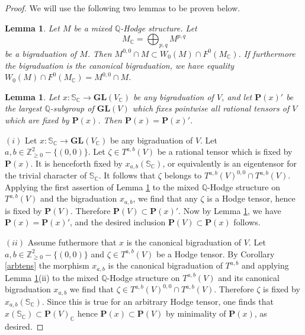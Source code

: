 \documentclass[10pt]{article}
\numberwithin{equation}{subsection}
\theoremstyle{plain}
\newtheorem{lemma}[theorem]{Lemma}
\theoremstyle{definition}
\theoremstyle{remark}
\newcommand{\Z}{\mathbb Z}
\newcommand{\Q}{\mathbb Q}
\newcommand{\C}{\mathbb C}
\newcommand{\s}{\mathbb S}
\newcommand{\pp}{\mathbf P}
\newcommand{\gl}{\mathbf{GL}}
\begin{document}
\begin{proof}
We will use the following two lemmas to be proven below.
\begin{lemma}\label{tenszero}
Let $M$ be a mixed $\Q$-Hodge structure. Let
\[
M_\C = \bigoplus_{p,q} M^{p,q}
\]
be a bigraduation of $M$. Then $M^{0,0} \cap M \subset W_0(M) \cap F^0(M_\C)$. If furthermore the bigraduation is the canonical bigraduation, we have equality $W_0(M) \cap F^0(M_\C) = M^{0,0} \cap M$.
\end{lemma}
\begin{lemma}\label{extchar}
Let $x : \s_\C \rightarrow \gl(V_\C)$ be any bigraduation of $V$, and let $\pp(x)'$ be the largest $\Q$-subgroup of $\gl(V)$ which fixes pointwise all rational tensors of $V$ which are fixed by $\pp(x)$. Then $\pp(x) = \pp(x)'$.
\end{lemma}
$(i)$ Let $x : \s_\C \rightarrow \gl(V_\C)$ be any bigraduation of $V$. Let $a,b \in \Z^2_{\geqslant 0} - \{(0,0)\}$. Let $\zeta \in T^{a,b}(V)$ be a rational tensor which is fixed by $\pp(x)$. It is henceforth fixed by $x_{a,b}(\s_\C)$, or equivalently is an eigentensor for the trivial character of $\s_\C$. It follows that $\zeta$ belongs to $T^{a,b}(V)^{0,0} \cap T^{a,b}(V)$. Applying the first assertion of Lemma \ref{tenszero} to the mixed $\Q$-Hodge structure on $T^{a,b}(V)$ and the bigraduation $x_{a,b}$, we find that any $\zeta$ is a Hodge tensor, hence is fixed by $\pp(V)$. Therefore $\pp(V) \subset \pp(x)'$. Now by Lemma \ref{extchar}, we have $\pp(x) = \pp(x)'$, and the desired inclusion $\pp(V) \subset \pp(x)$ follows.

$(ii)$ Assume futhermore that $x$ is the canonical bigraduation of $V$. Let $a,b \in \Z^2_{\geqslant 0} - \{(0,0)\}$ and $\zeta \in T^{a,b}(V)$ be a Hodge tensor. By Corollary \ref{arbtens} the morphism $x_{a,b}$ is the canonical bigraduation of $T^{a,b}$ and applying Lemma \ref{tenszero}(ii) to the mixed $\Q$-Hodge structure on $T^{a,b}(V)$ and its canonical bigraduation $x_{a,b}$ we find that $\zeta \in T^{a,b}(V)^{0,0} \cap T^{a,b}(V)$. Therefore $\zeta$ is fixed by $x_{a,b}(\s_\C)$. Since this is true for an arbitrary Hodge tensor, one finds that $x(\s_\C) \subset \pp(V)_\C$ hence $\pp(x) \subset \pp(V)$ by minimality of $\pp(x)$, as desired.
\end{proof}
\end{document}
